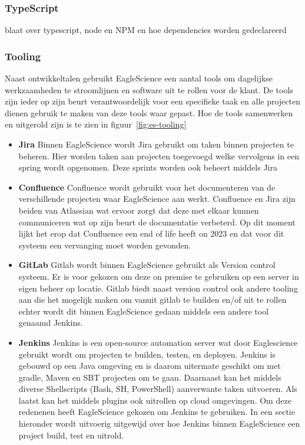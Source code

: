 \subsubsection{TypeScript}
blaat over typescript, node en NPM en hoe dependencies worden gedeclareerd

\subsubsection{Tooling}\label{subsec:tooling}
Naast ontwikkeltalen gebruikt EagleScience een aantal tools om dagelijkse werkzaamheden te stroomlijnen en software uit te rollen voor de klant. De tools zijn ieder op zijn beurt verantwoordelijk voor een specifieke taak en alle projecten dienen gebruik te maken van deze tools waar gepast. Hoe de tools samenwerken en uitgerold zijn is te zien in figuur~\ref{fig:es-tooling}

\begin{itemize}
    \item \textbf{Jira} Binnen EagleScience wordt Jira gebruikt om taken binnen projecten te beheren. Hier worden taken aan projecten toegevoegd welke vervolgens in een spring wordt opgenomen. Deze sprints worden ook beheert middels Jira
    \item \textbf{Confluence}
    Confluence wordt gebruikt voor het documenteren van de verschillende projecten waar EagleScience aan werkt. Confluence en Jira zijn beiden van Atlassian wat ervoor zorgt dat deze met elkaar kunnen communiceren wat op zijn beurt de documentatie verbeterd. Op dit moment lijkt het erop dat Confluence een end of life heeft on 2023 en dat voor dit systeem een vervanging moet worden gevonden.
    \item \textbf{GitLab}
    Gitlab wordt binnen EagleScience gebruikt als Version control systeem. Er is voor gekozen om deze on premise te gebruiken op een server in eigen beheer op locatie. Gitlab biedt naast version control ook andere tooling aan die het mogelijk maken om vanuit gitlab te builden en/of uit te rollen echter wordt dit binnen EagleScience gedaan middels een andere tool genaamd Jenkins.
    \item \textbf{Jenkins}
    Jenkins is een open-source automation server wat door Eaglescience gebruikt wordt om projecten te builden, testen, en deployen. Jenkins is gebouwd op een Java omgeving en is daarom uitermate geschikt om met gradle, Maven en SBT projecten om te gaan. Daarnaast kan het middels diverse Shellscripts (Bash, SH, PowerShell) aanverwante taken uitvoeren. Als laatst kan het middels plugins ook uitrollen op cloud omgevingen. Om deze redenenen heeft EagleScience gekozen om Jenkins te gebruiken. In een sectie hieronder wordt uitvoerig uitgewijd over hoe Jenkins binnen EagleScience een project build, test en uitrold.
\end{itemize}
